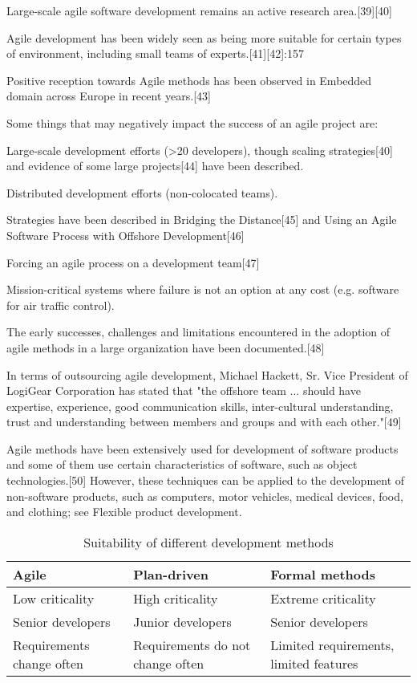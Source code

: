 Large-scale agile software development remains an active research area.[39][40]

Agile development has been widely seen as being more suitable for certain types of environment, including small teams of experts.[41][42]:157

Positive reception towards Agile methods has been observed in Embedded domain across Europe in recent years.[43]

Some things that may negatively impact the success of an agile project are:

Large-scale development efforts (>20 developers), though scaling strategies[40] and evidence of some large projects[44] have been described.

Distributed development efforts (non-colocated teams). 

Strategies have been described in Bridging the Distance[45] and Using an Agile Software Process with Offshore Development[46]

Forcing an agile process on a development team[47]

Mission-critical systems where failure is not an option at any cost (e.g. software for air traffic control).

The early successes, challenges and limitations encountered in the adoption of agile methods in a large organization have been documented.[48]

In terms of outsourcing agile development, Michael Hackett, Sr. Vice President of LogiGear Corporation has stated that "the offshore team ... should have expertise, experience, good communication skills, inter-cultural understanding, trust and understanding between members and groups and with each other."[49]

Agile methods have been extensively used for development of software products and some of them use certain characteristics of software, such as object technologies.[50] However, these techniques can be applied to the development of non-software products, such as computers, motor vehicles, medical devices, food, and clothing; see Flexible product development.

\begin{longtable}{|p{}|p{}|p{}|}
\caption{Suitability of different development methods}\label{tab:suitabilityddm} \\
	\hline
	\textbf{Agile} & \textbf{Plan-driven} & \textbf{Formal methods} \\
	\hline
	\endhead
	Low criticality & High criticality & Extreme criticality \\
	\hline
	Senior developers & Junior developers & Senior developers \\
	\hline
	Requirements change often & Requirements do not change often & Limited requirements, limited features \\
	\hline
\end{longtable}


